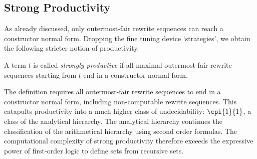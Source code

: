 \subsection{Strong Productivity}\label{sec:productivity:subsec:strong}

As already discussed, only outermost-fair rewrite sequences can reach a constructor normal form.
Dropping the fine tuning device `strategies', 
we obtain the following stricter notion of productivity.
\begin{definition}\normalfont\label{def:strongproductivity}
A term $t$ is called \emph{strongly productive}
  if all maximal outermost-fair rewrite sequences starting from $t$ end in a constructor normal form.
\end{definition}
The definition requires all outermost-fair rewrite sequences to end in a constructor normal form,
including non-computable rewrite sequences.
This catapults 
productivity into a much higher class of undecidability:
$\cpi{1}{1}$, a class of the analytical hierarchy.
The analytical hierarchy continues the classification
of the arithmetical hierarchy using second order formulas.
The computational complexity of strong productivity therefore
exceeds the expressive power of first-order logic 
to define sets from recursive sets.

